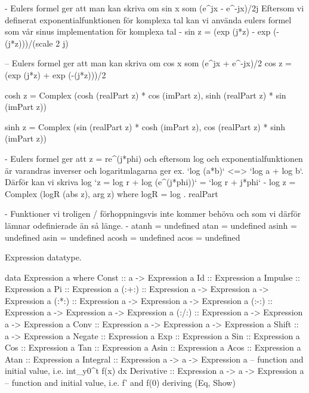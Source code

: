 \begin{codefig}
\begin{code}
{-
   Eulers formel ger att man kan skriva om sin x som (e^jx - e^-jx)/2j
   Eftersom vi definerat exponentialfunktionen för komplexa tal kan vi använda
   eulers formel som vår sinus implementation för komplexa tal
-}
  sin z = (exp (j*z) - exp (-(j*z)))/(scale 2 j)

-- Eulers formel ger att man kan skriva om cos x som (e^jx + e^-jx)/2
  cos z = (exp (j*z) + exp (-(j*z)))/2

  cosh z = Complex (cosh (realPart z) * cos (imPart z),
                    sinh (realPart z) * sin (imPart z))

  sinh z = Complex (sin (realPart z) * cosh (imPart z),
                    cos (realPart z) * sinh (imPart z))

{-
   Eulers formel ger att z = re^(j*phi) och eftersom log och exponentialfunktionen
   är varandras inverser och logaritmlagarna ger ex. `log (a*b)` <=> `log a + log b`.
   Därför kan vi skriva log `z = log r + log (e^(j*phi))` = `log r + j*phi`
-}
  log z = Complex (logR (abs z), arg z)
    where logR = log . realPart

{-
  Funktioner vi troligen / förhoppningsvis inte kommer behöva och som vi därför lämnar
  odefinierade än så länge.
-}
  atanh = undefined
  atan  = undefined
  asinh = undefined
  asin  = undefined
  acosh = undefined
  acos  = undefined
\end{code}
\end{codefig}


\begin{codefig}
\caption{Expression datatype.} \label{code:expression-datatype}
\begin{code}
data Expression a where
  Const      :: a -> Expression a
  Id         :: Expression a
  Impulse    :: Expression a
  Pi         :: Expression a
  (:+:)      :: Expression a -> Expression a -> Expression a 
  (:*:)      :: Expression a -> Expression a -> Expression a 
  (:-:)      :: Expression a -> Expression a -> Expression a 
  (:/:)      :: Expression a -> Expression a -> Expression a
  Conv       :: Expression a -> Expression a -> Expression a
  Shift      :: a -> Expression a 
  Negate     :: Expression a
  Exp        :: Expression a
  Sin        :: Expression a
  Cos        :: Expression a
  Tan        :: Expression a
  Asin       :: Expression a
  Acos       :: Expression a
  Atan       :: Expression a
  Integral   :: Expression a -> a -> Expression a -- function and initial value, i.e. int_y0^t f(x) dx 
  Derivative :: Expression a -> a -> Expression a -- function and initial value, i.e. f' and f(0)
 deriving (Eq, Show)
\end{code}
\end{codefig}

